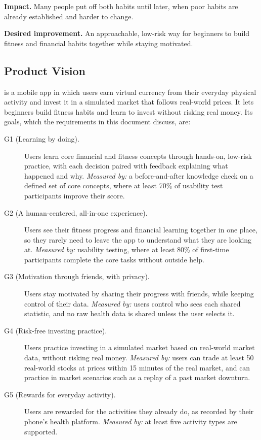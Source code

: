 \documentclass[12pt]{article}
\begin{document}
\textbf{Impact.} Many people put off both habits until later, when poor habits
are already established and harder to change.

\textbf{Desired improvement.} An approachable, low-risk way for beginners to
build fitness and financial habits together while staying motivated.

\subsection{Product Vision} \label{SecProductVision}


\progname{} is a mobile app in which users earn virtual currency from their
everyday physical activity and invest it in a simulated market that follows
real-world prices. It lets beginners build fitness habits and learn to invest
without risking real money. Its goals, which the requirements in this document
discuss, are:

\begin{description}
  \item[G1 (Learning by doing).] Users learn core financial and fitness
  concepts through hands-on, low-risk practice, with each decision paired with
  feedback explaining what happened and why. \textit{Measured by:} a
  before-and-after knowledge check on a defined set of core concepts, where at
  least 70\% of usability test participants improve their score.
  \item[G2 (A human-centered, all-in-one experience).] Users see their fitness
  progress and financial learning together in one place, so they rarely need
  to leave the app to understand what they are looking at. \textit{Measured
  by:} usability testing, where at least 80\% of first-time participants
  complete the core tasks without outside help.
  \item[G3 (Motivation through friends, with privacy).] Users stay motivated by
  sharing their progress with friends, while keeping control of their data.
  \textit{Measured by:} users control who sees each shared statistic, and no
  raw health data is shared unless the user selects it.
  \item[G4 (Risk-free investing practice).] Users practice investing in a
  simulated market based on real-world market data, without risking real
  money. \textit{Measured by:} users can trade at least 50 real-world stocks at
  prices within 15 minutes of the real market, and can practice in market
  scenarios such as a replay of a past market downturn.
  \item[G5 (Rewards for everyday activity).] Users are rewarded for the
  activities they already do, as recorded by their phone's health platform.
  \textit{Measured by:} at least five activity types are supported.
\end{description}
  
\end{document}

